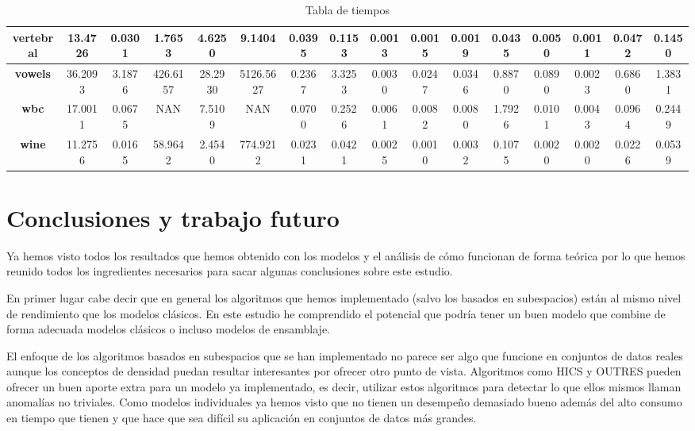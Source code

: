 \begin{table}
{\begin{tabular}{|c|c|c|c|c|c|c|c|c|c|c|c|c|c|c|c|}
		\textbf{vertebral}        & 13.4726      & 0.0301    & 1.7653      & 4.6250    & 9.1404    & 0.0395    & 0.1153   & 0.0013    & 0.0015   & 0.0019   & 0.0435   & 0.0050     & 0.0011   & 0.0472   & 0.1450    \\ \hline
		\textbf{vowels}           & 36.2093      & 3.1876    & 426.6157    & 28.2930   & 5126.5627 & 0.2367    & 3.3253   & 0.0030    & 0.0247   & 0.0346   & 0.8870   & 0.0890     & 0.0023   & 0.6860   & 1.3831   \\ \hline
		\textbf{wbc}              & 17.0011      & 0.0675    & NAN             & 7.5109    & NAN           & 0.0700    & 0.2526   & 0.0061    & 0.0082   & 0.0080   & 1.7926   & 0.0101     & 0.0043   & 0.0964   & 0.2449    \\ \hline
		\textbf{wine}             & 11.2756      & 0.0165    & 58.9642     & 2.4540    & 774.9212  & 0.0231    & 0.0421   & 0.0025    & 0.0010   & 0.0032   & 0.1075   & 0.0020     & 0.0020   & 0.0226   & 0.0539    \\ \hline
	\end{tabular}
}
\caption{Tabla de tiempos}
\end{table}

\clearpage

\section{Conclusiones y trabajo futuro}

Ya hemos visto todos los resultados que hemos obtenido con los modelos y el análisis de cómo funcionan de forma teórica por lo que hemos reunido todos los ingredientes necesarios para sacar algunas conclusiones sobre este estudio.

En primer lugar cabe decir que en general los algoritmos que hemos implementado (salvo los basados en subespacios) están al mismo nivel de rendimiento que los modelos clásicos. En este estudio he comprendido el potencial que podría tener un buen modelo que combine de forma adecuada modelos clásicos o incluso modelos de ensamblaje.

El enfoque de los algoritmos basados en subespacios que se han implementado no parece ser algo que funcione en conjuntos de datos reales aunque los conceptos de densidad puedan resultar interesantes por ofrecer otro punto de vista. Algoritmos como HICS y OUTRES pueden ofrecer un buen aporte extra para un modelo ya implementado, es decir, utilizar estos algoritmos para detectar lo que ellos mismos llaman anomalías no triviales. Como modelos individuales ya hemos visto que no tienen un desempeño demasiado bueno además del alto consumo en tiempo que tienen y que hace que sea difícil su aplicación en conjuntos de datos más grandes. 

